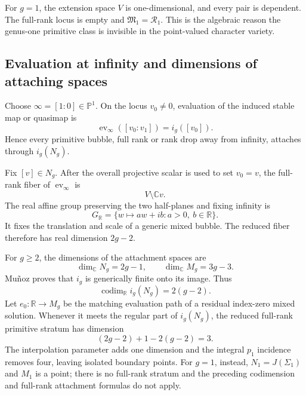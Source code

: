 \documentclass[11pt]{amsart}
\theoremstyle{definition}
\theoremstyle{remark}
\theoremstyle{plain}
\newcommand{\RR}{\mathbb{R}}
\newcommand{\CC}{\mathbb{C}}
\newcommand{\PP}{\mathbb{P}}
\newcommand{\cR}{\mathcal{R}}
\newcommand{\frakM}{\mathfrak{M}}
\newcommand{\ev}{\operatorname{ev}}
\newcommand{\codim}{\operatorname{codim}}
\begin{document}
For $g=1$, the extension space $V$ is one-dimensional, and every pair is
dependent.  The full-rank locus is empty and $\frakM_1=\cR_1$.  This is
the algebraic reason the genus-one primitive class is invisible in the
point-valued character variety.

\subsection{Evaluation at infinity and dimensions of attaching spaces}
\label{sec:evaluation-infinity}
Choose $\infty=[1:0]\in\PP^1$.  On the locus $v_0\neq0$, evaluation of
the induced stable map or quasimap is
\begin{equation}\label{eq:ev-infinity}
 \ev_\infty([v_0:v_1])=i_g([v_0]).
\end{equation}
Hence every primitive bubble, full rank or rank drop away from infinity,
attaches through $i_g(N_g)$.

Fix $[v]\in N_g$.  After the overall projective scalar is used to set
$v_0=v$, the full-rank fiber of $\ev_\infty$ is
\[
                              V\setminus\CC v.
\]
The real affine group preserving the two half-planes and fixing infinity
is
\begin{equation}\label{eq:GR}
 G_\RR=\{w\longmapsto aw+ib:a>0,\ b\in\RR\}.
\end{equation}
It fixes the translation and scale of a generic mixed bubble.  The reduced
fiber therefore has real dimension $2g-2$.

For $g\geq2$, the dimensions of the attachment spaces are
\begin{equation}\label{eq:dimensions-N-M}
             \dim_\CC N_g=2g-1,
       \qquad\dim_\CC M_g=3g-3.
\end{equation}
Mu\~noz proves that $i_g$ is generically finite onto its image.  Thus
\begin{equation}\label{eq:image-codim}
                 \codim_\RR i_g(N_g)=2(g-2).
\end{equation}
Let $e_0:\RR\to M_g$ be the matching evaluation path of a residual
index-zero mixed solution.  Whenever it meets the regular part of
$i_g(N_g)$, the reduced full-rank primitive stratum has dimension
\begin{equation}\label{eq:bubble-dim-ledger}
                 (2g-2)+1-2(g-2)=3.
\end{equation}
The interpolation parameter adds one dimension and the integral $p_1$
incidence removes four, leaving isolated boundary points.
For $g=1$, instead, $N_1=J(\Sigma_1)$ and $M_1$ is a point;
there is no full-rank stratum and the preceding codimension
and full-rank attachment formulas do not apply.
\end{document}
